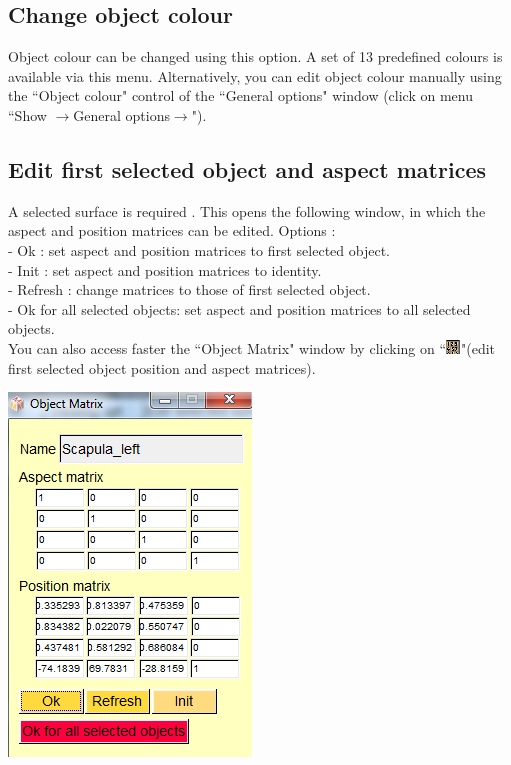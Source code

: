 \subsection{Change object colour}
Object colour can be changed using this option. A set of 13 predefined colours is available via this menu. Alternatively, you can edit object colour manually using the ``Object colour" control of the ``General options" window (click on menu ``Show $\rightarrow$General options$\rightarrow$").

\subsection{Edit first selected object and aspect matrices}

\noindent
\begin{minipage}{0.6\textwidth}

A selected surface is required . This opens the following window,
in which the aspect and position matrices can be edited.
Options :\\
- Ok : set aspect and position matrices to first selected object.\\
- Init : set aspect and position matrices to identity.\\
- Refresh : change matrices to those of first selected object.\\
- Ok for all selected objects: set aspect and position matrices to
all selected objects.\\
You can also access faster the ``Object Matrix" window by clicking
on ``\includegraphics[scale=0.7]{images/pixmap/mat.png}"(edit first selected object position and aspect matrices).

\end{minipage}    
\begin{minipage}{0.4\textwidth}\centering
  \includegraphics[scale=0.5]{images/File/Position2.png}
 \end{minipage} 
\noindent



